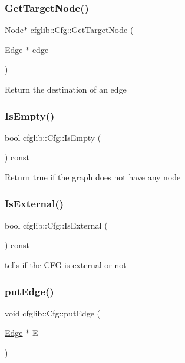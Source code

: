 \subsubsection{\texorpdfstring{Get\+Target\+Node()}{GetTargetNode()}}
{\footnotesize\ttfamily \hyperlink{classcfglib_1_1Node}{Node}$\ast$ cfglib\+::\+Cfg\+::\+Get\+Target\+Node (\begin{DoxyParamCaption}\item[{\hyperlink{classcfglib_1_1Edge}{Edge} $\ast$}]{edge }\end{DoxyParamCaption})}

Return the destination of an edge \mbox{\label{classcfglib_1_1Cfg_a09c2fff20ceddf2a659bbc8e64559f8e}} 
\subsubsection{\texorpdfstring{Is\+Empty()}{IsEmpty()}}
{\footnotesize\ttfamily bool cfglib\+::\+Cfg\+::\+Is\+Empty (\begin{DoxyParamCaption}{ }\end{DoxyParamCaption}) const}

Return true if the graph does not have any node \mbox{\label{classcfglib_1_1Cfg_a53c796e515ba5bdad1dd17b5e2cea403}} 
\subsubsection{\texorpdfstring{Is\+External()}{IsExternal()}}
{\footnotesize\ttfamily bool cfglib\+::\+Cfg\+::\+Is\+External (\begin{DoxyParamCaption}{ }\end{DoxyParamCaption}) const}

tells if the C\+FG is external or not \mbox{\label{classcfglib_1_1Cfg_aca4049e467e6979666c3273bf3e3045a}} 
\subsubsection{\texorpdfstring{put\+Edge()}{putEdge()}}
{\footnotesize\ttfamily void cfglib\+::\+Cfg\+::put\+Edge (\begin{DoxyParamCaption}\item[{\hyperlink{classcfglib_1_1Edge}{Edge} $\ast$}]{E }\end{DoxyParamCaption})}


